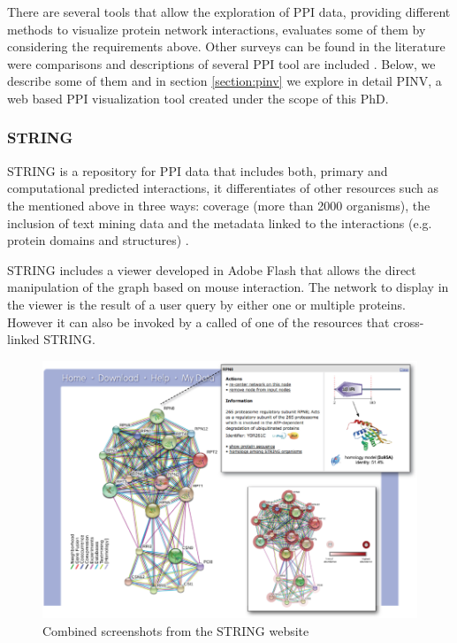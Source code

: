 There are several tools that allow the exploration of PPI data, providing different methods to visualize protein network interactions, \cite{AGA2013} evaluates some of them by considering the requirements above. Other surveys can be found in the literature were comparisons and descriptions of several PPI tool are included \cite{SUD2007, PAV2008, GEH2010}. Below, we describe some of them and in section \ref{section:pinv} we explore in detail PINV, a web based PPI visualization tool created under the scope of this PhD.

\subsubsection{STRING}
STRING is a repository for PPI data that includes both, primary and computational predicted interactions, it differentiates of other resources such as the mentioned above in three ways: coverage (more than 2000 organisms), the inclusion of text mining data and the metadata linked to the interactions (e.g. protein domains and structures) \cite{FRA2013}.

STRING includes a viewer developed in Adobe Flash that allows the direct manipulation of the graph based on mouse interaction. The network to display in the viewer is the result of a user query by either one or multiple proteins. However it can also be invoked by a called of one of the resources that cross-linked STRING.

\begin{figure}  
\centering
\includegraphics[width=\textwidth]{figures/string.png}
\caption[STRING Snapshot.]{Combined screenshots from the STRING website
\label{fig:string}}
\end{figure}

